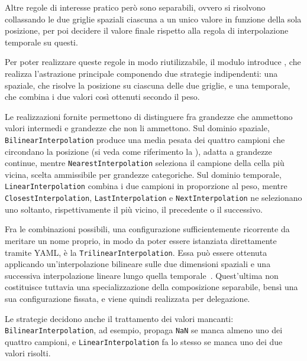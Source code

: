 Altre regole di interesse pratico però sono separabili, ovvero si risolvono collassando
le due griglie spaziali ciascuna a un unico valore in funzione della sola posizione,
per poi decidere il valore finale rispetto alla regola di interpolazione temporale su questi.

Per poter realizzare queste regole in modo riutilizzabile, il
modulo introduce , che realizza l'astrazione
principale componendo due strategie indipendenti: una spaziale, che risolve la posizione
su ciascuna delle due griglie, e una temporale, che combina i due valori così ottenuti
secondo il peso.

Le realizzazioni fornite permettono di distinguere fra grandezze che ammettono valori intermedi e
grandezze che non li ammettono. Sul dominio spaziale, \texttt{BilinearInterpolation}
produce una media pesata dei quattro campioni che circondano la posizione (si veda come riferimento la ), adatta a
grandezze continue, mentre \texttt{NearestInterpolation} seleziona il campione della cella
più vicina, scelta ammissibile per grandezze categoriche. Sul dominio temporale,
\texttt{LinearInterpolation} combina i due campioni in proporzione al peso, mentre
\texttt{ClosestInterpolation}, \texttt{LastInterpolation} e \texttt{NextInterpolation} ne
selezionano uno soltanto, rispettivamente il più vicino, il precedente o il successivo.

Fra le combinazioni possibili, una configurazione sufficientemente ricorrente da meritare
un nome proprio, in modo da poter essere istanziata direttamente tramite YAML, è la \texttt{TrilinearInterpolation}.
Essa può essere ottenuta applicando un'interpolazione bilineare sulle due dimensioni spaziali
e una successiva interpolazione lineare lungo quella temporale~\cite{engel2006realtime}.
Quest'ultima non costituisce tuttavia una specializzazione della composizione separabile,
bensì una sua configurazione fissata, e viene quindi realizzata per delegazione.

Le strategie decidono anche il trattamento dei valori mancanti: \texttt{BilinearInterpolation},
ad esempio, propaga \texttt{NaN} se manca almeno uno dei quattro campioni, e
\texttt{LinearInterpolation} fa lo stesso se manca uno dei due valori risolti.

